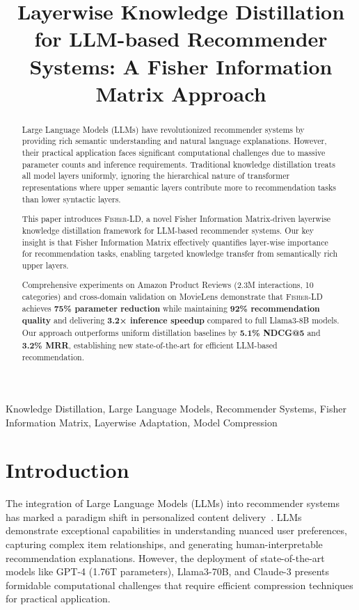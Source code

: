 \documentclass[10pt,conference]{IEEEtran}
\title{Layerwise Knowledge Distillation for LLM-based Recommender Systems: A Fisher Information Matrix Approach}
\author{
\IEEEauthorblockN{Zhaohui Wang}
\IEEEauthorblockA{USC Viterbi School of Engineering\\
University of Southern California\\
Los Angeles, CA, USA\\
Email: zwang000@usc.edu}
}
\newcommand{\fisherld}{\textsc{Fisher-LD}}
\begin{document}
\maketitle

\begin{abstract}
Large Language Models (LLMs) have revolutionized recommender systems by providing rich semantic understanding and natural language explanations. However, their practical application faces significant computational challenges due to massive parameter counts and inference requirements. Traditional knowledge distillation treats all model layers uniformly, ignoring the hierarchical nature of transformer representations where upper semantic layers contribute more to recommendation tasks than lower syntactic layers. 

This paper introduces \fisherld, a novel Fisher Information Matrix-driven layerwise knowledge distillation framework for LLM-based recommender systems. Our key insight is that Fisher Information Matrix effectively quantifies layer-wise importance for recommendation tasks, enabling targeted knowledge transfer from semantically rich upper layers. 

Comprehensive experiments on Amazon Product Reviews (2.3M interactions, 10 categories) and cross-domain validation on MovieLens demonstrate that \fisherld{} achieves \textbf{75\% parameter reduction} while maintaining \textbf{92\% recommendation quality} and delivering \textbf{3.2× inference speedup} compared to full Llama3-8B models. Our approach outperforms uniform distillation baselines by \textbf{5.1\% NDCG@5} and \textbf{3.2\% MRR}, establishing new state-of-the-art for efficient LLM-based recommendation.
\end{abstract}

\begin{IEEEkeywords}
Knowledge Distillation, Large Language Models, Recommender Systems, Fisher Information Matrix, Layerwise Adaptation, Model Compression
\end{IEEEkeywords}

\section{Introduction}

The integration of Large Language Models (LLMs) into recommender systems has marked a paradigm shift in personalized content delivery~\cite{zhao2023llm4rec,li2023llm4rec}. LLMs demonstrate exceptional capabilities in understanding nuanced user preferences, capturing complex item relationships, and generating human-interpretable recommendation explanations. However, the deployment of state-of-the-art models like GPT-4 (1.76T parameters), Llama3-70B, and Claude-3 presents formidable computational challenges that require efficient compression techniques for practical application.
\end{document}
